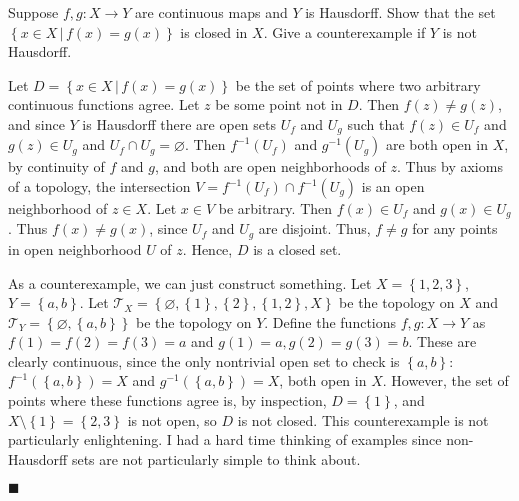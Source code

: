 \documentclass[12pt]{article}
\renewcommand{\qed}{\hfill$\blacksquare$}
\renewenvironment{proof}{\begin{addmargin}[1em]{0em}\begin{newproof}}{\end{newproof}\end{addmargin}\qed}
\newenvironment{problem}[2][Problem]{\begin{trivlist}
\item[\hskip \labelsep {\bfseries #1}\hskip \labelsep {\bfseries #2.}]}{\end{trivlist}}
\begin{document}
\begin{problem}{2-10}
Suppose $f,g:X\rightarrow Y$ are continuous maps and $Y$ is Hausdorff. Show that the set $\left\{x\in X\, | \, f\left(x\right)=g\left(x\right)\right\}$ is closed in $X$. Give a counterexample if $Y$ is not Hausdorff.
\end{problem}
\begin{proof}
Let $D=\left\{x\in X\, | \, f\left(x\right)=g\left(x\right)\right\}$ be the set of points where two arbitrary continuous functions agree. Let $z$ be some point not in $D$. Then $f\left(z\right)\neq g\left(z\right)$, and since $Y$ is Hausdorff there are open sets $U_f$ and $U_g$ such that $f\left(z\right) \in U_f$ and $g\left(z\right) \in U_g$ and $U_f\cap U_g=\varnothing$. Then $f^{-1}\left(U_f\right)$ and $g^{-1}\left(U_g\right)$ are both open in $X$, by continuity of $f$ and $g$, and both are open neighborhoods of $z$. Thus by axioms of a topology, the intersection $V = f^{-1}\left(U_f\right)\cap f^{-1}\left(U_g\right)$ is an open neighborhood of $z \in X$. Let $x\in V$ be arbitrary. Then $f\left(x\right) \in U_f$ and $g\left(x\right) \in U_g$. Thus $f\left(x\right)\neq g\left(x\right)$, since $U_f$ and $U_g$ are disjoint. Thus, $f \neq g$ for any points in open neighborhood $U$ of $z$. Hence, $D$ is a closed set.

As a counterexample, we can just construct something. Let $X=\left\{1,2,3\right\}$, $Y=\left\{a,b\right\}$. Let $\mathcal{T}_X = \left\{\varnothing, \left\{1\right\}, \left\{2\right\}, \left\{1,2\right\},X\right\}$ be the topology on $X$ and $\mathcal{T}_Y = \left\{\varnothing, \left\{a,b\right\}\right\}$ be the topology on $Y$. Define the functions $f,g:X\rightarrow Y$ as $f\left(1\right)=f\left(2\right)=f\left(3\right)=a$ and $g\left(1\right)=a, g\left(2\right)=g\left(3\right)=b$. These are clearly continuous, since the only nontrivial open set to check is $\left\{a,b\right\}$: $f^{-1}\left(\left\{a,b\right\}\right) = X$ and $g^{-1}\left(\left\{a,b\right\}\right) = X$, both open in $X$. However, the set of points where these functions agree is, by inspection, $D=\left\{1\right\}$, and $X\setminus \left\{1\right\} = \left\{2,3\right\}$ is not open, so $D$ is not closed. {\color{red} This counterexample is not particularly enlightening. I had a hard time thinking of examples since non-Hausdorff sets are not particularly simple to think about.}
\end{proof}
\end{document}
